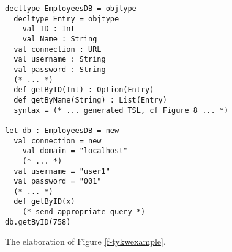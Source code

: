 \documentclass{sig-alternate}[10pt]
\newcommand{\typecolor}[1]{\textcolor[HTML]{660066}{#1}}
\newcommand{\mycaption}[1]{\vspace{-10px}\caption{#1}\vspace{-8px}}
\begin{document}


\begin{figure}[t]
\begin{lstlisting}[style=wyvern]
decltype EmployeesDB = objtype
  decltype Entry = objtype
    val ID : Int
    val Name : String 
  val connection : URL
  val username : String
  val password : String
  (* ... *)
  def getByID(Int) : Option(Entry)
  def getByName(String) : List(Entry)
  syntax = (* ... generated TSL, cf Figure 8 ... *)

let db : EmployeesDB = new
  val connection = new
    val domain = "localhost"
    (* ... *)
  val username = "user1"
  val password = "001"
  (* ... *)
  def getByID(x)
    (* send appropriate query *)
db.getByID(758)
\end{lstlisting}
\mycaption{The elaboration of Figure \ref{f-tykwexample}.}
\label{typekw-example-2}
\end{figure}
\end{document}
